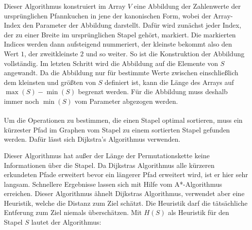 \documentclass[a4paper,10pt,ngerman]{scrartcl}
\begin{document}
Dieser Algorithmus konstruiert im Array $V$ eine Abbildung der Zahlenwerte der ursprünglichen Pfannkuchen in
jene der kanonischen Form, wobei der Array-Index den Parameter der Abbildung darstellt. Dafür wird zunächst jeder
Index, der zu einer Breite im ursprünglichen Stapel gehört, markiert. Die markierten Indices werden dann aufsteigend
nummeriert, der kleinste bekommt also den Wert $1$, der zweitkleinste $2$ und so weiter. So ist die Konstruktion
der Abbildung vollständig. Im letzten Schritt wird die Abbildung auf die Elemente von $S$ angewandt. Da die Abbildung
nur für bestimmte Werte zwischen einschließlich dem kleinsten und größten von $S$ definiert ist, kann die Länge des Arrays
auf $\max(S)-\min(S)$ begrenzt werden. Für die Abbildung muss deshalb immer noch $\min(S)$ vom Parameter abgezogen werden.
\\\\
Um die Operationen zu bestimmen, die einen Stapel optimal sortieren, muss
ein kürzester Pfad im Graphen vom Stapel zu einem sortierten Stapel gefunden werden. Dafür lässt sich
Dijkstra's Algorithmus \cite{dijkstra_1959} verwenden.
\begin{algorithmic}
  \EndIf
  \EndIf
  \EndFor
  \EndWhile
  \EndProcedure
\end{algorithmic}
Dieser Algorithmus hat außer der Länge der Permutationskette keine Informationen über die Stapel.
Da Dijkstras Algorithmus alle kürzeren erkundeten Pfade erweitert bevor ein längerer Pfad erweitert
wird, ist er hier sehr langsam. Schnellere Ergebnisse lassen sich mit Hilfe vom A*-Algorithmus \cite{hart_1968} erreichen.
Dieser Algorithmus ähnelt Dijkstras Algorithmus, verwendet aber eine Heuristik, welche die Distanz zum
Ziel schätzt. Die Heuristik darf die tätsächliche Entferung zum Ziel niemals überschätzen. Mit $H(S)$ als Heuristik
für den Stapel $S$ lautet der Algorithmus:\\\\
\end{document}
